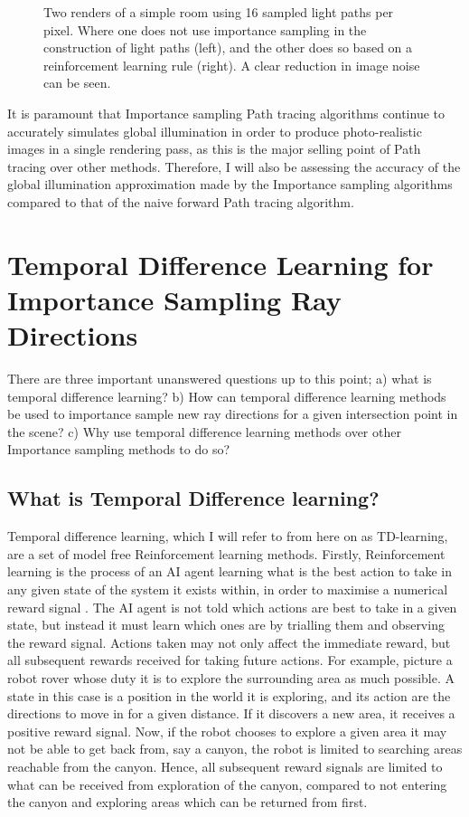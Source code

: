 \documentclass[ %
                    author={Callum Pearce},
                supervisor={Dr. Neill Campbell},
                    degree={MEng},
                     title={How effective are Temporal difference learning methods for reducing the number of zero contribution light paths, while still accurately approximating Global Illumination in Path tracing?},
                  subtitle={},
                      type={research},
                      year={2019} ]{dissertation}
\begin{document}
\begin{figure}[h]
\begin{minipage}{.45\textwidth}
\end{minipage}
\caption{Two renders of a simple room using 16 sampled light paths per pixel. Where one does not use importance sampling in the construction of light paths (left), and the other does so based on a reinforcement learning rule (right). A clear reduction in image noise can be seen.}
\label{fig:noise_reduction_simple_room}
\end{figure}

It is paramount that Importance sampling Path tracing algorithms continue to accurately
simulates global illumination in order to produce photo-realistic images in a single
rendering pass, as this is the major selling point of Path tracing over other 
methods. Therefore, I will also be assessing the accuracy of the global
illumination approximation made by the Importance sampling algorithms compared
to that of the naive forward Path tracing algorithm.

\section{Temporal Difference Learning for Importance Sampling Ray Directions}
\label{sec:td_learn_for_importance}

There are three important unanswered questions up to this point; a) what is temporal
difference learning?  b) How can temporal difference learning methods be 
used to importance sample new ray directions for a given intersection point in 
the scene? c) Why use temporal difference learning methods over other Importance 
sampling methods to do so? 

\subsection{What is Temporal Difference learning?}
Temporal difference learning, which I will refer to from 
here on as TD-learning, are a set of model free Reinforcement learning methods. 
Firstly, Reinforcement learning is the process of an AI agent learning what is the 
best action to take in any given state of the system it exists within, in order to 
maximise a numerical reward signal \cite{sutton2011reinforcement}.
The AI agent is not told which actions are  best to take in a given state, but
 instead it must learn which ones are by trialling them and observing the reward 
signal. Actions taken may not only affect the immediate 
reward, but all subsequent rewards received for taking future actions. For 
example, picture a robot rover whose duty it is to explore the surrounding area 
as much possible. A state in this case is a position in the world it is exploring, 
and its action are the directions to move in for a given distance. If it discovers 
a new area, it receives a positive reward signal. Now, if the robot chooses to 
explore a given area it may not be able to get back from, say a canyon, the 
robot is limited to searching areas reachable from the canyon. Hence, all 
subsequent reward signals are limited to what can be received from exploration 
of the canyon, compared to not entering the canyon and exploring areas which 
can be returned from first.
\end{document}
